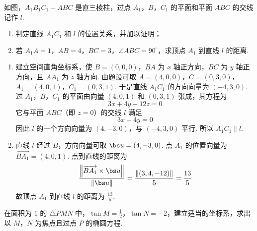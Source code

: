 \documentclass[UTF8,a4paper,oneside,11pt]{ctexbook}
\begin{document}
\begin{problem}
如图，\(A_{1}B_{1}C_{1}-ABC\) 是直三棱柱，过点 \(A_{1}\)，\(B\)，\(C_{1}\) 的平面和平面 \(ABC\) 的交线记作 \(l\).

\begin{enumerate}
\item 判定直线 \(A_{1}C_{1}\) 和 \(l\) 的位置关系，并加以证明；
\item 若 \(A_{1}A = 1\)，\(AB = 4\)，\(BC = 3\)，\(\angle ABC = 90^{\circ}\)，求顶点 \(A_{1}\) 到直线 \(l\) 的距离.
\end{enumerate}

\end{problem}

\begin{solution}
\begin{enumerate}
\item 建立空间直角坐标系，使 \(B=(0,0,0)\)，\(BA\) 为 \(x\) 轴正方向，\(BC\) 为 \(y\) 轴正方向，且 \(AA_1\) 为 \(z\) 轴方向. 由题设可取
\(A=(4,0,0)\)，\(C=(0,3,0)\)，\(A_1=(4,0,1)\)，\(C_1=(0,3,1)\).
于是直线 \(A_1C_1\) 的方向向量为 \((-4,3,0)\). 过 \(A_1\)，\(B\)，\(C_1\) 的平面由向量 \((4,0,1)\) 和 \((0,3,1)\) 张成，其方程为
\[
3x+4y-12z=0
\]
它与平面 \(ABC\)（即 \(z=0\)）的交线 \(l\) 满足
\[
3x+4y=0
\]
因此 \(l\) 的一个方向向量为 \((4,-3,0)\)，与 \((-4,3,0)\) 平行. 所以 \(A_1C_1\parallel l\).

\item 直线 \(l\) 经过 \(B\)，方向向量可取 \(\bs u=(4,-3,0)\). 点 \(A_1\) 的位置向量为 \(\overrightarrow{BA_1}=(4,0,1)\). 点到直线的距离为
\[
\frac{\left\|\overrightarrow{BA_1}\times\bs u\right\|}{\left\|\bs u\right\|}
=\frac{\left\|(3,4,-12)\right\|}{5}
=\frac{13}{5}
\]
故顶点 \(A_1\) 到直线 \(l\) 的距离为 \(\frac{13}{5}\).
\end{enumerate}
\end{solution}

\begin{problem}
在面积为 \(1\) 的 \(\triangle PMN\) 中，\(\tan M = \frac{1}{2}\)，\(\tan N = -2\)，建立适当的坐标系，求出以 \(M\)，\(N\) 为焦点且过点 \(P\) 的椭圆方程.
\end{problem}
\end{document}
